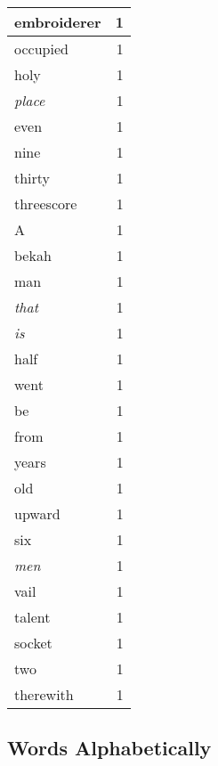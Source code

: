 \begin{center}
\begin{longtable}{l|r}
embroiderer & 1 \\ \hline
occupied & 1 \\ \hline
holy & 1 \\ \hline
\emph{place} & 1 \\ \hline
even & 1 \\ \hline
nine & 1 \\ \hline
thirty & 1 \\ \hline
threescore & 1 \\ \hline
A & 1 \\ \hline
bekah & 1 \\ \hline
man & 1 \\ \hline
\emph{that} & 1 \\ \hline
\emph{is} & 1 \\ \hline
half & 1 \\ \hline
went & 1 \\ \hline
be & 1 \\ \hline
from & 1 \\ \hline
years & 1 \\ \hline
old & 1 \\ \hline
upward & 1 \\ \hline
six & 1 \\ \hline
\emph{men} & 1 \\ \hline
vail & 1 \\ \hline
talent & 1 \\ \hline
socket & 1 \\ \hline
two & 1 \\ \hline
therewith & 1 \\ \hline
\end{longtable}
\end{center}



\normalsize



\subsection{Words Alphabetically}

